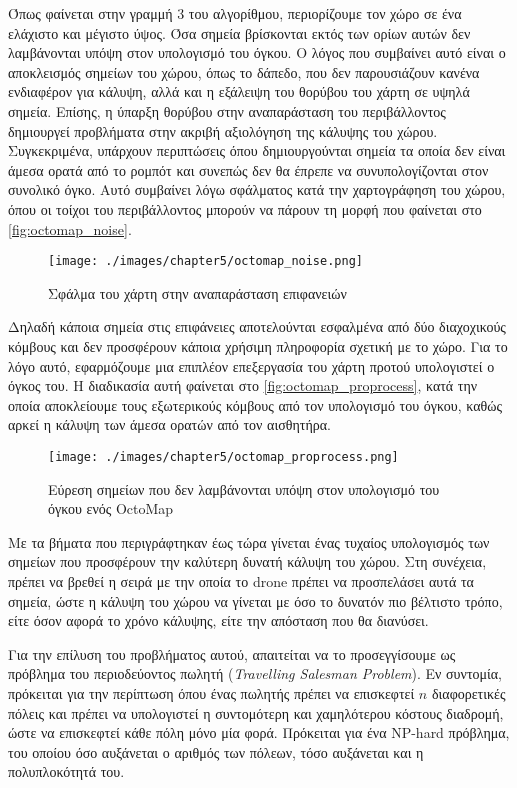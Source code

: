 Όπως φαίνεται στην γραμμή 3 του αλγορίθμου, περιορίζουμε τον χώρο σε ένα ελάχιστο και μέγιστο ύψος. Όσα σημεία βρίσκονται εκτός των ορίων αυτών δεν λαμβάνονται υπόψη στον υπολογισμό του όγκου. Ο λόγος που συμβαίνει αυτό είναι ο αποκλεισμός σημείων του χώρου, όπως το δάπεδο, που δεν παρουσιάζουν κανένα ενδιαφέρον για κάλυψη, αλλά και η εξάλειψη του θορύβου του χάρτη σε υψηλά σημεία. Επίσης, η ύπαρξη θορύβου στην αναπαράσταση του περιβάλλοντος δημιουργεί προβλήματα στην ακριβή αξιολόγηση της κάλυψης του χώρου. Συγκεκριμένα, υπάρχουν περιπτώσεις όπου δημιουργούνται σημεία τα οποία δεν είναι άμεσα ορατά από το ρομπότ και συνεπώς δεν θα έπρεπε να συνυπολογίζονται στον συνολικό όγκο. Αυτό συμβαίνει λόγω σφάλματος κατά την χαρτογράφηση του χώρου, όπου οι τοίχοι του περιβάλλοντος μπορούν να πάρουν τη μορφή που φαίνεται στο \autoref{fig:octomap_noise}.

\begin{figure}[!ht]
    \centering
    \texttt{[image: ./images/chapter5/octomap\_noise.png]}
    \caption{Σφάλμα του χάρτη στην αναπαράσταση επιφανειών}
    \label{fig:octomap_noise}
\end{figure}

Δηλαδή κάποια σημεία στις επιφάνειες αποτελούνται εσφαλμένα από δύο διαχοχικούς κόμβους και δεν προσφέρουν κάποια χρήσιμη πληροφορία σχετική με το χώρο. Για το λόγο αυτό, εφαρμόζουμε μια επιπλέον επεξεργασία του χάρτη προτού υπολογιστεί ο όγκος του. Η διαδικασία αυτή φαίνεται στο \autoref{fig:octomap_proprocess}, κατά την οποία αποκλείουμε τους εξωτερικούς κόμβους από τον υπολογισμό του όγκου, καθώς αρκεί η κάλυψη των άμεσα ορατών από τον αισθητήρα.

\begin{figure}[!ht]
    \centering
    \texttt{[image: ./images/chapter5/octomap\_proprocess.png]}
    \caption{Εύρεση σημείων που δεν λαμβάνονται υπόψη στον υπολογισμό του όγκου ενός OctoMap}
    \label{fig:octomap_proprocess}
\end{figure}

Με τα βήματα που περιγράφτηκαν έως τώρα γίνεται ένας τυχαίος υπολογισμός των σημείων που προσφέρουν την καλύτερη δυνατή κάλυψη του χώρου. Στη συνέχεια, πρέπει να βρεθεί η σειρά με την οποία το drone πρέπει να προσπελάσει αυτά τα σημεία, ώστε η κάλυψη του χώρου να γίνεται με όσο το δυνατόν πιο βέλτιστο τρόπο, είτε όσον αφορά το χρόνο κάλυψης, είτε την απόσταση που θα διανύσει. 

Για την επίλυση του προβλήματος αυτού, απαιτείται να το προσεγγίσουμε ως πρόβλημα του περιοδεύοντος πωλητή (\emph{Travelling Salesman Problem}). Εν συντομία, πρόκειται για την περίπτωση όπου ένας πωλητής πρέπει να επισκεφτεί $n$ διαφορετικές πόλεις και πρέπει να υπολογιστεί η συντομότερη και χαμηλότερου κόστους διαδρομή, ώστε να επισκεφτεί κάθε πόλη μόνο μία φορά. Πρόκειται για ένα NP-hard πρόβλημα, του οποίου όσο αυξάνεται ο αριθμός των πόλεων, τόσο αυξάνεται και η πολυπλοκότητά του. 

